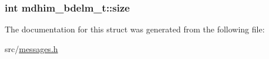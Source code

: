 \hypertarget{structmdhim__bdelm__t_a1c92bb6d1ffe28e7cd24aa2041f469da}{
\subsubsection[{size}]{\setlength{\rightskip}{0pt plus 5cm}int mdhim\-\_\-bdelm\-\_\-t\-::size}}\label{d4/ddf/structmdhim__bdelm__t_a1c92bb6d1ffe28e7cd24aa2041f469da}


The documentation for this struct was generated from the following file\-:\begin{DoxyCompactItemize}
\item 
src/\hyperlink{messages_8h}{messages.\-h}\end{DoxyCompactItemize}
